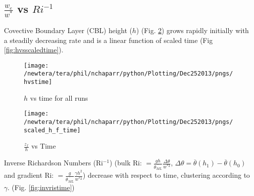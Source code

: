 \subsection{$\frac{w_{e}}{w^{*}}$ vs $Ri^{-1}$}
\FloatBarrier
Covective Boundary Layer (CBL) height ($h$) (Fig. \ref{fig:hvstime}) grows rapidly initially with a steadily decreasing rate
and is a linear function of scaled time (Fig \ref{fig:hvsscaledtime}).\\
  
\begin{figure}[htbp]
    \centering
    \texttt{[image: /newtera/tera/phil/nchaparr/python/Plotting/Dec252013/pngs/hvstime]}
    \caption{$h$ vs time for all runs}
    \label{fig:hvstime}   %
\end{figure}


\begin{figure}[htbp]
    \centering
    \texttt{[image: /newtera/tera/phil/nchaparr/python/Plotting/Dec252013/pngs/scaled\_h\_f\_time]}
    \caption{$\frac{z_{f}}{h}$ vs Time}
    \label{fig:hvstime}   %
\end{figure}





Inverse Richardson Numbers (\acs{Ri}$^{-1}$) (bulk \acs{Ri}: $=\frac{gh}{\overline{\theta_{ML}}} \frac{\Delta \theta}{w^{*2}}$, $\Delta \theta = \overline{\theta}(h_{1})-\overline{\theta}(h_{0})$ 
and gradient \acs{Ri}: $=\frac{g}{\overline{\theta_{ML}}} \frac{\gamma h^{2} }{w^{*2}}$) decrease with respect to time, 
clustering according to $\gamma$. (Fig. \ref{fig:invristime})\\

